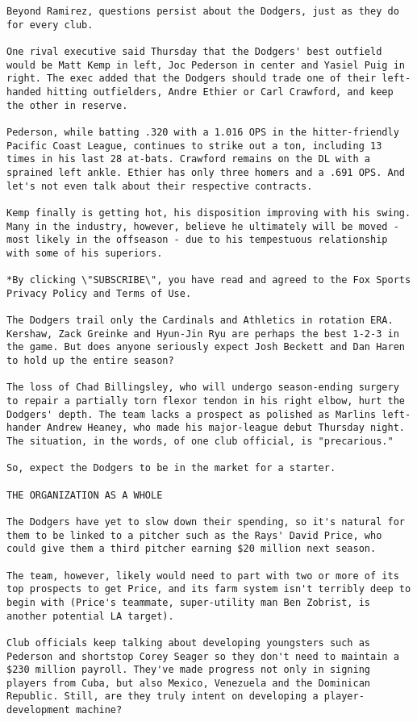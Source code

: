\begin{lstlisting}
Beyond Ramirez, questions persist about the Dodgers, just as they do for every club.

One rival executive said Thursday that the Dodgers' best outfield would be Matt Kemp in left, Joc Pederson in center and Yasiel Puig in right. The exec added that the Dodgers should trade one of their left-handed hitting outfielders, Andre Ethier or Carl Crawford, and keep the other in reserve.

Pederson, while batting .320 with a 1.016 OPS in the hitter-friendly Pacific Coast League, continues to strike out a ton, including 13 times in his last 28 at-bats. Crawford remains on the DL with a sprained left ankle. Ethier has only three homers and a .691 OPS. And let's not even talk about their respective contracts.

Kemp finally is getting hot, his disposition improving with his swing. Many in the industry, however, believe he ultimately will be moved - most likely in the offseason - due to his tempestuous relationship with some of his superiors.

*By clicking \"SUBSCRIBE\", you have read and agreed to the Fox Sports Privacy Policy and Terms of Use.

The Dodgers trail only the Cardinals and Athletics in rotation ERA. Kershaw, Zack Greinke and Hyun-Jin Ryu are perhaps the best 1-2-3 in the game. But does anyone seriously expect Josh Beckett and Dan Haren to hold up the entire season?

The loss of Chad Billingsley, who will undergo season-ending surgery to repair a partially torn flexor tendon in his right elbow, hurt the Dodgers' depth. The team lacks a prospect as polished as Marlins left-hander Andrew Heaney, who made his major-league debut Thursday night. The situation, in the words, of one club official, is "precarious."

So, expect the Dodgers to be in the market for a starter.

THE ORGANIZATION AS A WHOLE

The Dodgers have yet to slow down their spending, so it's natural for them to be linked to a pitcher such as the Rays' David Price, who could give them a third pitcher earning $20 million next season.

The team, however, likely would need to part with two or more of its top prospects to get Price, and its farm system isn't terribly deep to begin with (Price's teammate, super-utility man Ben Zobrist, is another potential LA target).

Club officials keep talking about developing youngsters such as Pederson and shortstop Corey Seager so they don't need to maintain a $230 million payroll. They've made progress not only in signing players from Cuba, but also Mexico, Venezuela and the Dominican Republic. Still, are they truly intent on developing a player-development machine?


\end{lstlisting}
